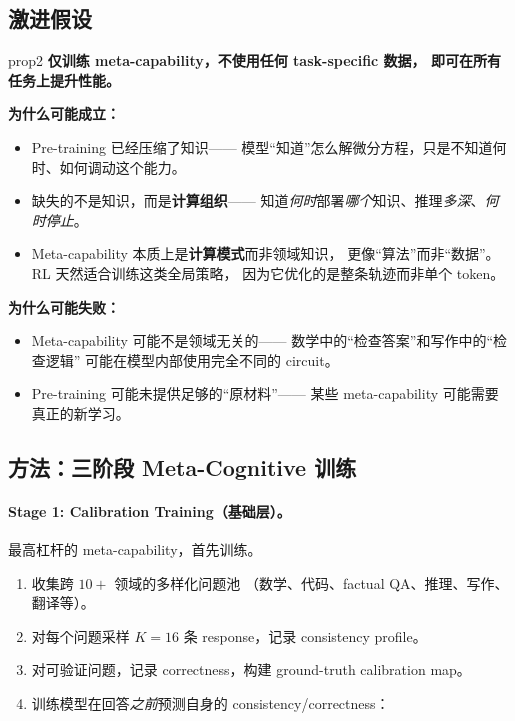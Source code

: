 \documentclass[12pt,a4paper]{article}
\begin{document}
\subsection{激进假设}

\begin{proposalbox}{prop2}
\textbf{仅训练 meta-capability，不使用任何 task-specific 数据，
即可在所有任务上提升性能。}
\end{proposalbox}

\noindent
\textbf{为什么可能成立：}
\begin{itemize}[leftmargin=2em]
  \item Pre-training 已经压缩了知识——
    模型``知道''怎么解微分方程，只是不知道何时、如何调动这个能力。
  \item 缺失的不是知识，而是\textbf{计算组织}——
    知道\textit{何时}部署\textit{哪个}知识、推理\textit{多深}、\textit{何时停止}。
  \item Meta-capability 本质上是\textbf{计算模式}而非领域知识，
    更像``算法''而非``数据''。
    RL 天然适合训练这类全局策略，
    因为它优化的是整条轨迹而非单个 token。
\end{itemize}

\noindent
\textbf{为什么可能失败：}
\begin{itemize}[leftmargin=2em]
  \item Meta-capability 可能不是领域无关的——
    数学中的``检查答案''和写作中的``检查逻辑''
    可能在模型内部使用完全不同的 circuit。
  \item Pre-training 可能未提供足够的``原材料''——
    某些 meta-capability 可能需要真正的新学习。
\end{itemize}

\subsection{方法：三阶段 Meta-Cognitive 训练}

\paragraph{Stage 1: Calibration Training（基础层）。}
最高杠杆的 meta-capability，首先训练。

\begin{enumerate}[leftmargin=2em]
  \item 收集跨 $10+$ 领域的多样化问题池
    （数学、代码、factual QA、推理、写作、翻译等）。
  \item 对每个问题采样 $K = 16$ 条 response，记录 consistency profile。
  \item 对可验证问题，记录 correctness，构建 ground-truth calibration map。
  \item 训练模型在回答\textit{之前}预测自身的 consistency/correctness：
\end{enumerate}
\end{document}
